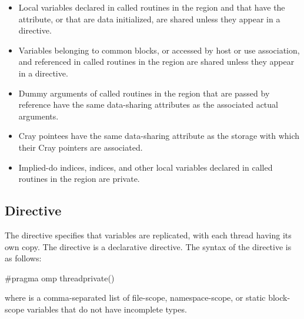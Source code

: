 \fortranspecificstart
\begin{itemize}
\item Local variables declared in called routines in the region and that have the  
attribute, or that are data initialized, are shared unless they appear in a 
 directive.

\item Variables belonging to common blocks, or accessed by host or use association, and referenced in called routines in the region are shared unless they appear in a  directive. 

\item Dummy arguments of called routines in the region that are passed by reference have the same data-sharing attributes as the associated actual arguments. 

\item Cray pointees have the same data-sharing attribute as the storage with which their Cray pointers are associated.

\item Implied-do indices,  indices, and other local variables declared in called 
routines in the region are private. 
\end{itemize}
\fortranspecificend









\subsection{ Directive}
\label{subsec:threadprivate Directive}
\summary
The  directive specifies that variables are replicated, with each thread 
having its own copy. The  directive is a declarative directive.
\syntax
\ccppspecificstart
The syntax of the  directive is as follows:

\begin{boxedcode}
\#pragma omp threadprivate() 
\end{boxedcode}

where  is a comma-separated list of file-scope, namespace-scope, or static 
block-scope variables that do not have incomplete types.
\ccppspecificend


